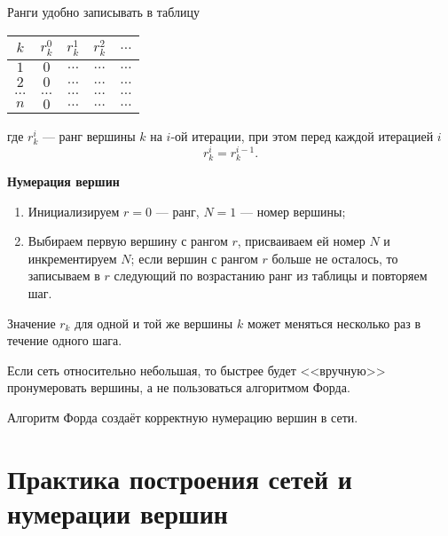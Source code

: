 \begin{note}
	Ранги удобно записывать в таблицу
	
	\begin{table}[H]
		\centering
		\begin{tabular}{ | c | c | c | c | c | } 
			\hline
			$k$ & $r_k^0$ & $r_k^1$ & $r_k^2$ & $\dots$ \\\hline
			$1$ & $0$ & $\dots$ & $\dots$ & $\dots$ \\\hline
			$2$ & $0$ & $\dots$ & $\dots$ & $\dots$ \\\hline
			$\dots$ & $\dots$ & $\dots$ & $\dots$ & $\dots$ \\\hline
			$n$ & $0$ & $\dots$ & $\dots$ & $\dots$ \\\hline
		\end{tabular}
	\end{table}
	
	где $r_k^i$ --- ранг вершины $k$ на $i$-ой итерации, при этом перед каждой итерацией $i$
	\[
	r_k^i = r_k^{i-1}.
	\]
\end{note}

\bigskip

\textbf{Нумерация вершин}

\begin{enumerate}[nosep]
	\item Инициализируем $r = 0$ --- ранг, $N = 1$ --- номер вершины;
	
	\item Выбираем первую вершину с рангом $r$, присваиваем ей номер $N$ и инкрементируем $N$; если вершин с рангом $r$ больше не осталось, то записываем в $r$ следующий по возрастанию ранг из таблицы и повторяем шаг.
\end{enumerate}

\remark

Значение $r_k$ для одной и той же вершины $k$ может меняться несколько раз в течение одного шага.

\remark

Если сеть относительно небольшая, то быстрее будет <<вручную>> пронумеровать вершины, а не пользоваться алгоритмом Форда.

\fact

Алгоритм Форда создаёт корректную нумерацию вершин в сети.

\section{Практика построения сетей и нумерации вершин}

